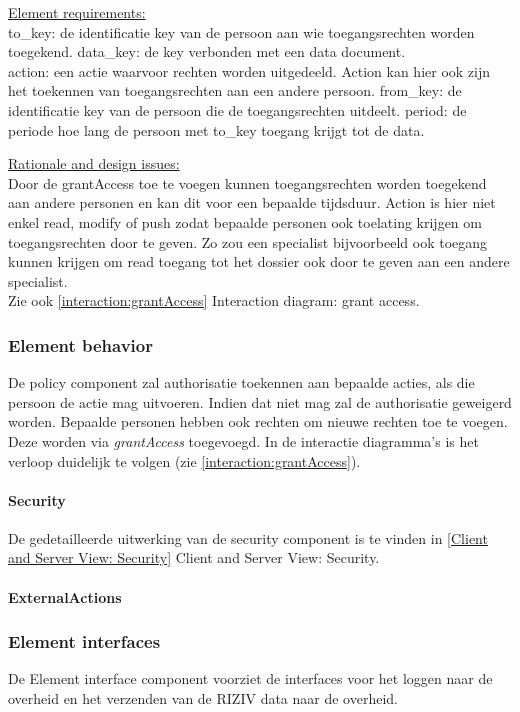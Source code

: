 \documentclass[a4paper,10pt]{article}
\begin{document}
\underline{Element requirements:}\\
to\_key: de identificatie key van de persoon aan wie toegangsrechten worden toegekend.
data\_key: de key verbonden met een data document.\\
action: een actie waarvoor rechten worden uitgedeeld.  Action kan hier ook zijn het toekennen van toegangsrechten aan een andere persoon.
from\_key: de identificatie key van de persoon die de toegangsrechten uitdeelt.
period: de periode hoe lang de persoon met to\_key toegang krijgt tot de data.

\underline{Rationale and design issues:}\\
Door de grantAccess toe te voegen kunnen toegangsrechten worden toegekend aan andere personen en kan dit voor een bepaalde tijdsduur.  Action is hier niet enkel read, modify of push zodat bepaalde personen ook toelating krijgen om toegangsrechten door te geven.  Zo zou een specialist bijvoorbeeld ook toegang kunnen krijgen om read toegang tot het dossier ook door te geven aan een andere specialist.\\
Zie ook \ref{interaction:grantAccess} Interaction diagram: grant access.

\subsubsection{Element behavior}
De policy component zal authorisatie toekennen aan bepaalde acties, als die persoon de actie mag uitvoeren.  Indien dat niet mag zal de authorisatie geweigerd worden.  Bepaalde personen hebben ook rechten om nieuwe rechten toe te voegen.  Deze worden via \textit{grantAccess} toegevoegd.  In de interactie diagramma's is het verloop duidelijk te volgen (zie \ref{interaction:grantAccess}).

\paragraph{Security}
De gedetailleerde uitwerking van de security component is te vinden in \ref{Client and Server View: Security} Client and Server View: Security.

\paragraph{ExternalActions}

\subsubsection{Element interfaces} 
De Element interface component voorziet de interfaces voor het loggen naar de overheid en het verzenden van de RIZIV data naar de overheid.
\end{document}

